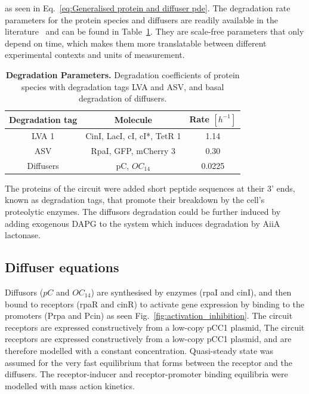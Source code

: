 as seen in Eq.~\ref{eq:Generalised protein and diffuser pde}.
The degradation rate parameters for the protein species and diffusers are readily available in the literature~\parencite{Andersen1998, kaufmann2005revisiting}
and can be found in Table~\ref{table:degradation table}.
They are scale-free parameters that only depend on time,
which makes them more translatable between different experimental contexts and units of measurement.



\begin{table}[H]
    \centering
    \begin{tabular}{|c|c|c|}
        \hline
        \textbf{Degradation tag} & \textbf{Molecule} & \textbf{Rate $[h^{-1}]$} \\
        \hline
        LVA 1 & CinI, LacI, cI, cI*, TetR 1 & 1.14 \\
        \hline
        ASV & RpaI, GFP, mCherry 3 & 0.30 \\
        \hline
        Diffusers & pC, $OC_{14}$ & 0.0225 \\
        \hline
    \end{tabular}
    \caption{\textbf{Degradation Parameters.} Degradation coefficients of protein species with degradation tags LVA and ASV, and basal degradation of diffusers.}
    \label{table:degradation table}
\end{table}

The proteins of the circuit were added short peptide sequences at their 3’ ends,
known as degradation tags, that promote their breakdown by the cell’s proteolytic enzymes.
The diffusors degradation could be further induced
by adding exogenous DAPG to the system which induces degradation by AiiA lactonase.

\subsection{Diffuser equations}
Diffusors ($pC$ and $OC_{14}$) are synthesised by enzymes (rpaI and cinI), and then bound to receptors (rpaR and cinR) to activate gene expression by binding to the promoters (Prpa and Pcin)
 as seen Fig.~\ref{fig:activation_inhibition}.
The circuit receptors are expressed constructively from a low-copy pCC1 plasmid,
The circuit receptors are expressed constructively from a low-copy pCC1 plasmid,
and are therefore modelled with a constant concentration.
Quasi-steady state was assumed for the very fast equilibrium that forms between the receptor and the diffusers.
The receptor-inducer and receptor-promoter binding equilibria were modelled with mass action kinetics.

